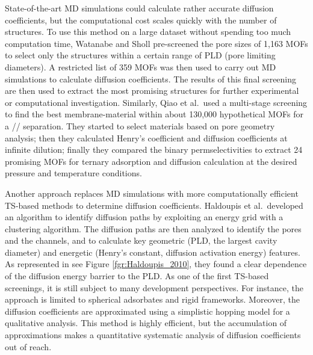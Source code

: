 \documentclass[main.tex]{subfiles}
\begin{document}
State-of-the-art MD simulations could calculate rather accurate diffusion coefficients, but the computational cost scales quickly with the number of structures. To use this method on a large dataset without spending too much computation time, Watanabe and Sholl pre-screened the pore sizes of 1,163 MOFs to select only the structures within a certain range of PLD (pore limiting diameters).\cite{Watanabe_2012} A restricted list of 359 MOFs was then used to carry out MD simulations to calculate diffusion coefficients. The results of this final screening are then used to extract the most promising structures for further experimental or computational investigation. Similarly, Qiao et al.\ used a multi-stage screening to find the best membrane-material within about 130,000 hypothetical MOFs for a // separation.\cite{Qiao_2016} They started to select materials based on pore geometry analysis; then they calculated Henry's coefficient and diffusion coefficients at infinite dilution; finally they compared the binary permselectivities to extract 24 promising MOFs for ternary adsorption and diffusion calculation at the desired pressure and temperature conditions.

Another approach replaces MD simulations with more computationally efficient TS-based methods to determine diffusion coefficients.
Haldoupis et al.\ developed an algorithm to identify diffusion paths by exploiting an energy grid with a clustering algorithm. The diffusion paths are then analyzed to identify the pores and the channels, and to calculate key geometric (PLD, the largest cavity diameter) and energetic (Henry's constant, diffusion activation energy) features.\cite{Haldoupis_2010}
As represented in see Figure \ref{fgr:Haldoupis_2010}, they found a clear dependence of the diffusion energy barrier to the PLD. As one of the first TS-based screenings, it is still subject to many development perspectives. For instance, the approach is limited to spherical adsorbates and rigid frameworks. Moreover, the diffusion coefficients are approximated using a simplistic hopping model for a qualitative analysis. This method is highly efficient, but the accumulation of approximations makes a quantitative systematic analysis of diffusion coefficients out of reach.
\end{document}

